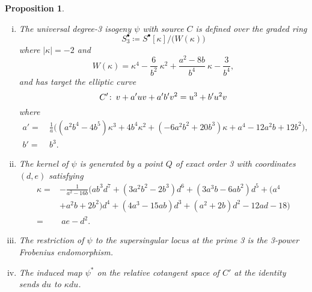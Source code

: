 \documentclass{gtpart}
\newtheorem{prop}[thm]{Proposition}
\theoremstyle{definition}
\theoremstyle{remark}
\def\co{\colon\thinspace}
\newcommand{\K}{\kappa}
\newcommand{\s}{S^\bullet}
\begin{document}
\begin{prop}
\label{prop:isog}
 \mbox{}
 \begin{enumerate}[(i)]
  \item \label{isog(i)} The universal degree-3 isogeny $\psi$ with source $C$ is defined over the graded ring 
  \[
   \s_3 \coloneqq \s [\K] \big/ \big( W(\K) \big) 
  \]
  where $|\K| = -2$ and 
  \begin{equation}
  \label{W}
   W(\K) = \K^4 - \frac{6}{b^2} ~ \K^2 + \frac{a^2 - 8 b}{b^4} ~ \K - \frac{3}{b^4}, 
  \end{equation}
  and has target the elliptic curve 
  \[
   C' \co v + a' u v + a' b' v^2 = u^3 + b' u^2 v 
  \]
  where 
  \begin{equation*}
  \begin{split}
   a' = & ~ \frac{1}{a} \big( (a^2 b^4 - 4 b^5) \K^3 + 4 b^4 \K^2 + (-6 a^2 b^2 + 20 b^3) \K + a^4 - 12 a^2 b + 12 b^2 \big), \\
   b' = & ~ b^3.  
  \end{split}
  \end{equation*}

  \item \label{isog(ii)} The kernel of $\psi$ is generated by a point $Q$ of exact order 3 with coordinates $(d,e)$ satisfying 
  \begin{equation}
  \label{K}
  \begin{split}
   \K = & -\frac{1}{a^2 - 16 b} \big( a b^3 d^7 + (3 a^2 b^2 - 2 b^3) d^6 + (3 a^3 b - 6 a b^2) d^5 + (a^4 \\
        & + a^2 b + 2 b^2) d^4 + (4 a^3 - 15 a b) d^3 + (a^2 + 2 b) d^2 - 12 a d - 18 \big) \\
      = & ~ a e - d^2.  
  \end{split}
  \end{equation}

  \item \label{isog(iii)} The restriction of $\psi$ to the supersingular locus at the prime 3 is the 3-power Frobenius endomorphism.  

  \item \label{isog(iv)} The induced map $\psi^*$ on the relative cotangent space of $C'$ at the identity sends $du$ to $\K du$.  
 \end{enumerate}
\end{prop}
\end{document}
